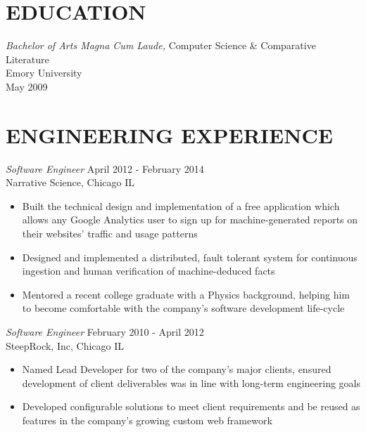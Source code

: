\documentclass[line,margin]{res}
\begin{document}
\address{waltaskew@gmail.com}
\address{404-819-9796}

\begin{resume}
 
\section{EDUCATION}
        {\sl Bachelor of Arts Magna Cum Laude,} 
        Computer Science \& Comparative Literature \\
        Emory University \\
        May 2009
 
\section{ENGINEERING EXPERIENCE}
        {\sl Software Engineer} \hfill April 2012 - February 2014 \\
        Narrative Science, Chicago IL
        \begin{itemize} 
          \item Built the technical design and implementation of a
            free application which allows any Google Analytics user to
            sign up for machine-generated reports on their websites'
            traffic and usage patterns
          \item Designed and implemented a distributed, fault tolerant
            system for continuous ingestion and human verification of
            machine-deduced facts
          \item Mentored a recent college graduate with a Physics
            background, helping him to become comfortable with
            the company's software development life-cycle
        \end{itemize}

        {\sl Software Engineer} \hfill February 2010 - April 2012 \\
        SteepRock, Inc, Chicago IL
        \begin{itemize}
        \item Named Lead Developer for two of the company's major
          clients, ensured development of client
          deliverables was in line with long-term engineering goals
        \item Developed configurable solutions to meet client
          requirements and be reused as features in the company's
          growing custom web framework
        \end{itemize}


\end{resume}
\end{document}

